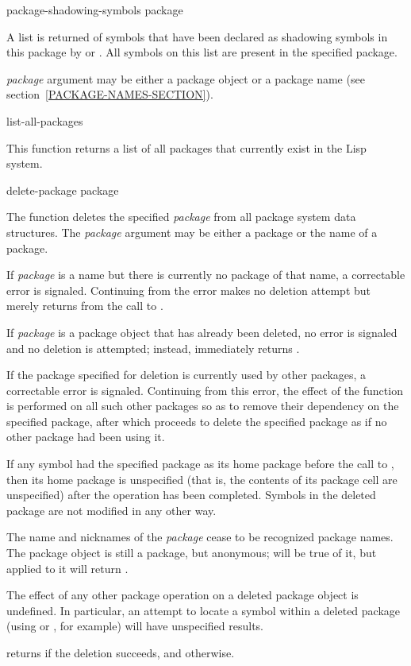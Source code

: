 \begin{defun}[Function]
package-shadowing-symbols package

A list is returned of symbols that have been declared as shadowing
symbols in this package by  or .  All
symbols on this list are present in the specified package.

\emph{package} argument may be either a package object
or a package name (see section~\ref{PACKAGE-NAMES-SECTION}).
\end{defun}

\begin{defun}[Function]
list-all-packages 

This function returns a list of all packages that currently exist in the
Lisp system.
\end{defun}

\begin{defun}[Function]
delete-package package

The  function 
deletes the specified \emph{package} from all package system data structures.
The \emph{package} argument may be either a package or the name of a package.

If \emph{package} is a name but there is currently no package of that name,
a correctable error is signaled.  Continuing from the error makes
no deletion attempt but merely returns  from the call to
.

If \emph{package} is a package object that has already been deleted,
no error is signaled and no deletion is attempted; instead,
 immediately returns .

If the package specified for deletion is currently used by other packages,
a correctable error is signaled.  Continuing from this error,
the effect of the function  is performed on all
such other packages so as to remove their dependency on the
specified package, after which  proceeds to
delete the specified package as if no other package had been using it.

If any symbol had the specified package as its home package before
the call to , then its home package is unspecified
(that is, the contents of its package cell are unspecified)
after the  operation has been completed.
Symbols in the deleted package are not modified in any other way.

The name and nicknames of the \emph{package} cease to be recognized package
names.  The package object is still a package, but anonymous;  will
be true of it, but  applied to it will return .

The effect of any other package operation on a deleted package object
is undefined.  In particular, an attempt to locate a symbol within a
deleted package (using  or , for example)
will have unspecified results.

 returns  if the deletion succeeds,
and  otherwise.
\end{defun}

